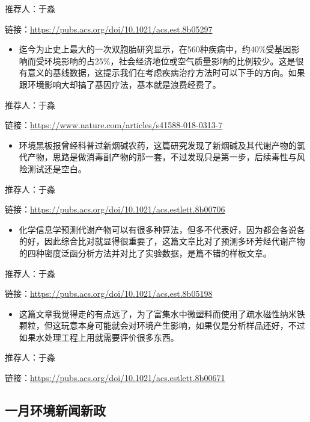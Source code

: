 \documentclass[
]{book}
\providecommand{\tightlist}{%
  \setlength{\itemsep}{0pt}\setlength{\parskip}{0pt}}
\begin{document}
推荐人：于淼

链接：\url{https://pubs.acs.org/doi/10.1021/acs.est.8b05297}

\begin{itemize}
\tightlist
\item
  迄今为止史上最大的一次双胞胎研究显示，在560种疾病中，约40\%受基因影响而受环境影响的占25\%，社会经济地位或空气质量影响的比例较少。这是很有意义的基线数据，这提示我们在考虑疾病治疗方法时可以下手的方向。如果跟环境影响大却搞了基因疗法，基本就是浪费经费了。
\end{itemize}

推荐人：于淼

链接：\url{https://www.nature.com/articles/s41588-018-0313-7}

\begin{itemize}
\tightlist
\item
  环境黑板报曾经科普过新烟碱农药，这篇研究发现了新烟碱及其代谢产物的氯代产物，思路是做消毒副产物的那一套，不过发现只是第一步，后续毒性与风险测试还是空白。
\end{itemize}

推荐人：于淼

链接：\url{https://pubs.acs.org/doi/10.1021/acs.estlett.8b00706}

\begin{itemize}
\tightlist
\item
  化学信息学预测代谢产物可以有很多种算法，但多不代表好，因为都会各说各的好，因此综合比对就显得很重要了，这篇文章比对了预测多环芳烃代谢产物的四种密度泛函分析方法并对比了实验数据，是篇不错的样板文章。
\end{itemize}

推荐人：于淼

链接：\url{https://pubs.acs.org/doi/10.1021/acs.est.8b05198}

\begin{itemize}
\tightlist
\item
  这篇文章我觉得走的有点远了，为了富集水中微塑料而使用了疏水磁性纳米铁颗粒，但这玩意本身可能就会对环境产生影响，如果仅是分析样品还好，不过如果水处理工程上用就需要评价很多东西。
\end{itemize}

推荐人：于淼

链接：\url{https://pubs.acs.org/doi/10.1021/acs.estlett.8b00671}

\hypertarget{ux4e00ux6708ux73afux5883ux65b0ux95fbux65b0ux653f}{%
\subsection*{一月环境新闻新政}\label{ux4e00ux6708ux73afux5883ux65b0ux95fbux65b0ux653f}}
\end{document}
